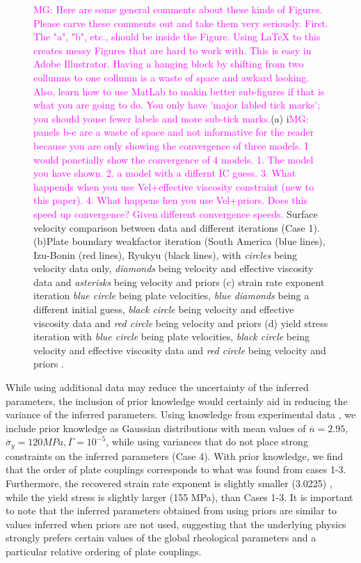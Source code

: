 \documentclass[12pt]{article}
\newcommand{\mgnote}[1]{\textcolor{magenta}{MG: #1}}
\begin{document}
\begin{figure}[H]
\caption{\mgnote{Here are some general comments about these kinds of Figures. Please carve these comments out and take them very seriously. First. The "a", "b", etc., should be inside the Figure. Using LaTeX to this creates messy Figures that are hard to work with. This is easy in Adobe Illustrator. Having a hanging block by shifting from two collumns to one collumn is a waste of space and awkard looking. Also, learn how to use MatLab to makin better sub-figures if that is what you are going to do. You only have 'major labled tick marks'; you should youse fewer labels and more sub-tick marks.}(a) i\mgnote{ panels b-e are a waste of space and not informative for the reader because you are only showing the convergence of three models. I would ponetially show the convergence of 4 models. 1. The model you have shown. 2. a model with a differnt IC guess. 3. What happends when you use Vel+effective viscosity constraint (new to this paper). 4. What happens hen you use Vel+priors. Does this speed up convergence? Given different convergence speeds. }Surface velocity comparison between data and different iterations (Case 1).(b)Plate boundary weakfactor iteration (South America (blue lines), Izu-Bonin (red lines), Ryukyu (black lines), with \textit{circles} being velocity data only, \textit{diamonds} being velocity and effective viscosity data and \textit{asterisks} being velocity and priors  (c) strain rate exponent iteration \textit{blue circle} being plate velocities, \textit{blue diamonds} being a different initial guess, \textit{black circle} being velocity and effective viscosity data and \textit{red circle} being velocity and priors (d) yield stress iteration with \textit{blue circle} being plate velocities, \textit{black circle} being velocity and effective viscosity data and \textit{red circle} being velocity and priors .}
\label{fig:inverse1}
\end{figure}

While using additional data may reduce the uncertainty of the inferred parameters, the inclusion of prior knowledge would certainly aid in reducing the variance of the inferred parameters. Using knowledge from experimental data \citep{korenaga2008new}, we include prior knowledge as Gaussian distributions with mean values of $\overline{n}=2.95$,$\overline{\sigma}_y = 120 MPa, \overline{\Gamma}=10^{-5}$, while using variances that do not place strong constraints on the inferred parameters (Case 4). 
 With prior knowledge, we find that the order of plate couplings corresponds to what was found from cases 1-3. Furthermore, the recovered strain rate exponent is slightly smaller (3.0225) , while the yield stress is slightly larger (155 MPa), than Cases 1-3. It is important to note that the inferred parameters obtained from using priors are similar to values inferred when priors are not used, suggesting that the underlying physics strongly prefers certain values of the global rheological parameters and a particular relative ordering of plate couplings.
\end{document}
